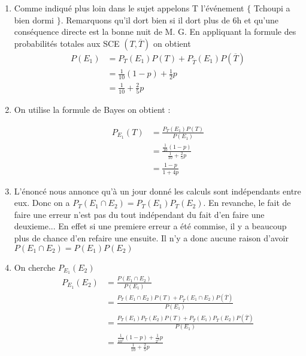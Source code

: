 \documentclass[a4paper, 11pt,reqno]{article}
\begin{document}
\begin{correction}
\begin{enumerate}
\item Comme indiqué plus loin dans le sujet appelons T l'événement $\{ $ Tchoupi a bien dormi $\} $. Remarquons qu'il dort bien si il dort plus de 6h et qu'une conséquence directe est la bonne nuit de M. G. En appliquant la formule des probabilités totales aux SCE $(T,\overline{T})$ on obtient 
\begin{align*}
 P(E_1) &=P_T(E_1)P(T) +P_{\overline{T}} (E_1) P(\overline{T} )\\
 			&= \frac{1}{10}(1-p) +\frac{1}{2}p\\
 			&=\frac{1}{10} +\frac{2}{5}p
\end{align*} 

 \item On utilise la formule de Bayes on obtient : 
 
\begin{align*}
P_{E_1} (T) & =\frac{P_T(E_1) P(T)}{P(E_1)}\\
				&= \frac{\frac{1}{10}(1-p)}{\frac{1}{10} +\frac{2}{5}p}\\
				&=\frac{1-p}{1+4p}
\end{align*}

\item L'énoncé nous annonce qu'à un jour donné les calculs sont indépendants entre eux. Donc on a $P_T(E_1\cap E_2)=P_T(E_1) P_T(E_2)$. En revanche, le fait de faire une erreur n'est pas du tout indépendant du fait d'en faire une deuxieme... En effet si une premiere erreur a été commise, il y a beaucoup plus de chance d'en refaire une ensuite.  Il n'y a donc aucune raison d'avoir 
$P(E_1 \cap E_2) =P(E_1) P(E_2)$

\item On cherche $P_{E_1}(E_2)$
\begin{align*}
P_{E_1}(E_2) &= \frac{P(E_1 \cap E_2) }{P(E_1)}\\
					&= \frac{P_T(E_1 \cap E_2)P(T) + P_{\overline{T}}(E_1 \cap E_2)P(\overline{T}) }{P(E_1)}\\
					&= \frac{P_T(E_1) P_T(E_2)P(T) + P_{\overline{T}}(E_1 ) P_{\overline{T}}(E_2)P(\overline{T}) }{P(E_1)}\\
					&= \frac{\frac{1}{10^2}(1- p) + \frac{1}{2^2} p}{ \frac{1}{10} +\frac{2}{5}p}
\end{align*}

\end{enumerate}
\end{correction}
\end{document}
